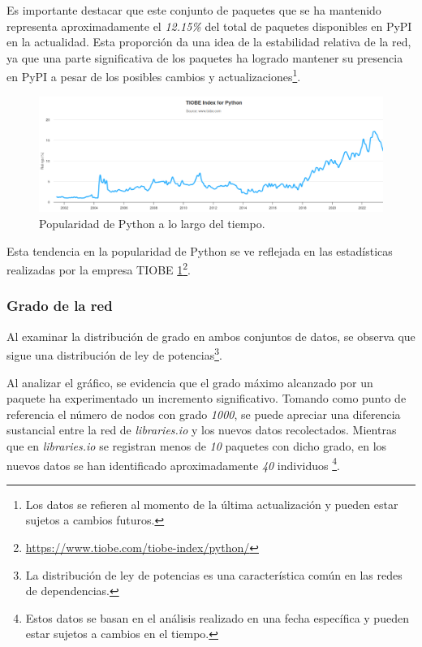 Es importante destacar que este conjunto de paquetes que se ha mantenido representa aproximadamente
el \textit{12.15\%} del total de paquetes disponibles en PyPI en la actualidad. Esta proporción
da una idea de la estabilidad relativa de la red, ya que una parte significativa de los
paquetes ha logrado mantener su presencia en PyPI a pesar de los posibles cambios y
actualizaciones\footnote{Los datos se refieren al momento de la última actualización y pueden estar
    sujetos a cambios futuros.}.

\begin{figure}[h!]
    \begin{center}
        \includegraphics[width=1\textwidth]{img/pypi/pypi_popularity.png}
        \caption{Popularidad de Python a lo largo del tiempo.}
        \label{fig:pypi_popularity}
    \end{center}
\end{figure}


Esta tendencia en la popularidad de Python se ve reflejada en las estadísticas realizadas por la
empresa TIOBE \ref{fig:pypi_popularity}\footnote{\url{https://www.tiobe.com/tiobe-index/python/}}.


\subsubsection{Grado de la red}

Al examinar la distribución de grado en ambos conjuntos de datos, se observa que sigue una distribución
de ley de potencias\footnote{La distribución de ley de potencias es una característica común en las redes
    de dependencias.}.

Al analizar el gráfico, se evidencia que el grado máximo alcanzado por un paquete ha
experimentado un incremento significativo. Tomando como punto de referencia el número de nodos con grado
\textit{1000}, se puede apreciar una diferencia sustancial entre la red de \textit{libraries.io} y los
nuevos datos recolectados. Mientras que en \textit{libraries.io} se registran menos de \textit{10} paquetes
con dicho grado, en los nuevos datos se han identificado aproximadamente \textit{40} individuos
\footnote{Estos datos se basan en el análisis realizado en una fecha específica y pueden estar sujetos
    a cambios en el tiempo.}.

